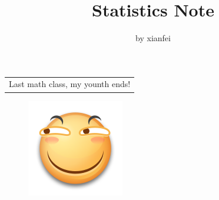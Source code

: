 \documentclass[a4paper]{ctexart}    %
\title{\textbf{Statistics Note}}
\author{by xianfei}
\date{}
\begin{document}
	\maketitle
	\noindent
	\thispagestyle{empty}
	\begin{table}[htbp!]
		\centering
		\begin{tabular}{c}
			\Large Last math class, my younth ends!
		\end{tabular}
	\end{table}
	\newpage
	\thispagestyle{empty}
	\tableofcontents
	\begin{figure}[htbp!]
		\centering
		\includegraphics{huaji1.png}
	\end{figure}
	\newpage
\end{document}
